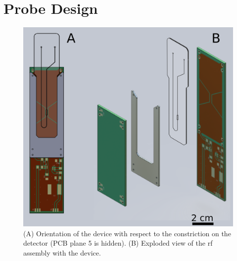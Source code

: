 \documentclass[preprint,5p]{elsarticle}
\begin{document}
\section{Probe Design}
\label{sec:probe-design}
\begin{figure}
\centering
\includegraphics[width=.5\linewidth,keepaspectratio=true]{./figures/ms5n17-tlp-im-190205-rf-device-assembly.png} 
\caption{(A) Orientation of the device with respect to the constriction on the detector (PCB plane 5 is hidden). (B) Exploded view of the rf assembly with the device. }
\label{fig:rf-device-assembly} 
\end{figure}
\end{document}
